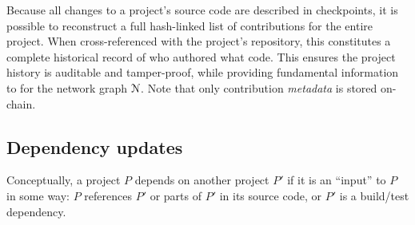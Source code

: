 Because all changes to a project's source code are described in checkpoints, it
is possible to reconstruct a full hash-linked list of contributions for the
entire project. When cross-referenced with the project's repository, this
constitutes a complete historical record of who authored what code. This
ensures the project history is auditable and tamper-proof, while providing
fundamental information to for the network graph $\mathcal{N}$. Note that only
contribution \emph{metadata} is stored on-chain.

\subsection{Dependency updates}
\label{s:checkpoint-deps}
Conceptually, a project $P$ depends on another project $P'$ if it is an
``input'' to $P$ in some way: $P$ references $P'$ or parts of $P'$ in its
source code, or $P'$ is a build/test dependency.

